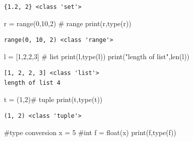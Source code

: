 \documentclass[
  letterpaper,
  DIV=11,
  numbers=noendperiod]{scrreprt}
\newenvironment{Shaded}{\begin{snugshade}}{\end{snugshade}}
\newcommand{\BuiltInTok}[1]{\textcolor[rgb]{0.00,0.23,0.31}{#1}}
\newcommand{\CommentTok}[1]{\textcolor[rgb]{0.37,0.37,0.37}{#1}}
\newcommand{\DecValTok}[1]{\textcolor[rgb]{0.68,0.00,0.00}{#1}}
\newcommand{\NormalTok}[1]{\textcolor[rgb]{0.00,0.23,0.31}{#1}}
\newcommand{\OperatorTok}[1]{\textcolor[rgb]{0.37,0.37,0.37}{#1}}
\newcommand{\StringTok}[1]{\textcolor[rgb]{0.13,0.47,0.30}{#1}}
\begin{document}
\begin{verbatim}
{1.2, 2} <class 'set'>
\end{verbatim}

\begin{Shaded}
\begin{Highlighting}[]
\NormalTok{r }\OperatorTok{=} \BuiltInTok{range}\NormalTok{(}\DecValTok{0}\NormalTok{,}\DecValTok{10}\NormalTok{,}\DecValTok{2}\NormalTok{) }\CommentTok{\# range}
\BuiltInTok{print}\NormalTok{(r,}\BuiltInTok{type}\NormalTok{(r))}
\end{Highlighting}
\end{Shaded}

\begin{verbatim}
range(0, 10, 2) <class 'range'>
\end{verbatim}

\begin{Shaded}
\begin{Highlighting}[]
\NormalTok{l }\OperatorTok{=}\NormalTok{ [}\DecValTok{1}\NormalTok{,}\DecValTok{2}\NormalTok{,}\DecValTok{2}\NormalTok{,}\DecValTok{3}\NormalTok{] }\CommentTok{\# list}
\BuiltInTok{print}\NormalTok{(l,}\BuiltInTok{type}\NormalTok{(l))}
\BuiltInTok{print}\NormalTok{(}\StringTok{"length of list"}\NormalTok{,}\BuiltInTok{len}\NormalTok{(l))}
\end{Highlighting}
\end{Shaded}

\begin{verbatim}
[1, 2, 2, 3] <class 'list'>
length of list 4
\end{verbatim}

\begin{Shaded}
\begin{Highlighting}[]
\NormalTok{t }\OperatorTok{=}\NormalTok{ (}\DecValTok{1}\NormalTok{,}\DecValTok{2}\NormalTok{)}\CommentTok{\# tuple}
\BuiltInTok{print}\NormalTok{(t,}\BuiltInTok{type}\NormalTok{(t))}
\end{Highlighting}
\end{Shaded}

\begin{verbatim}
(1, 2) <class 'tuple'>
\end{verbatim}

\begin{Shaded}
\begin{Highlighting}[]
\CommentTok{\#type conversion}
\NormalTok{x }\OperatorTok{=} \DecValTok{5} \CommentTok{\#int}
\NormalTok{f }\OperatorTok{=} \BuiltInTok{float}\NormalTok{(x)}
\BuiltInTok{print}\NormalTok{(f,}\BuiltInTok{type}\NormalTok{(f))}
\end{Highlighting}
\end{Shaded}
\end{document}
